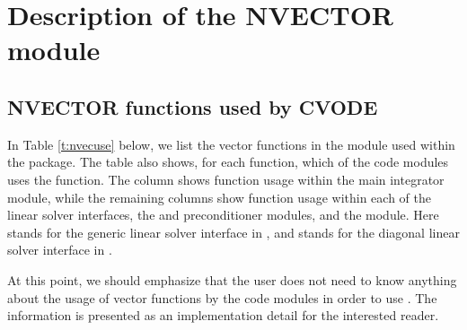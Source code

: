 \chapter{Description of the NVECTOR module}\label{s:nvector}



\section{NVECTOR functions used by CVODE}

In Table \ref{t:nvecuse} below, we list the vector functions in the
{\nvector} module used within the {\cvode} package.
The table also shows, for each function, which of the code modules uses
the function. The {\cvode} column shows function usage within the main
integrator module, while the remaining columns show function usage
within each of the {\cvode} linear solver interfaces, the {\cvbandpre} and
{\cvbbdpre} preconditioner modules, and the {\fcvode} module.  Here
{\cvls} stands for the generic linear solver interface in {\cvode},
and {\cvdiag} stands for the diagonal linear solver interface in {\cvode}.

At this point, we should emphasize that the {\cvode} user does not need to know
anything about the usage of vector functions by the {\cvode} code modules in order
to use {\cvode}. The information is presented as an implementation detail for the
interested reader.

